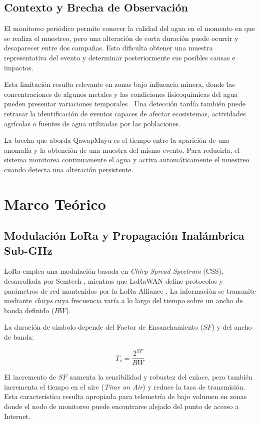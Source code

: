 \documentclass[11pt,a4paper]{article}
\begin{document}
\subsection{Contexto y Brecha de Observación}

El monitoreo periódico permite conocer la calidad del agua en el momento en que se realiza el muestreo, pero una alteración de corta duración puede ocurrir y desaparecer entre dos campañas. Esto dificulta obtener una muestra representativa del evento y determinar posteriormente sus posibles causas e impactos.

Esta limitación resulta relevante en zonas bajo influencia minera, donde las concentraciones de algunos metales y las condiciones fisicoquímicas del agua pueden presentar variaciones temporales \cite{moreno2024,ocona2024}. Una detección tardía también puede retrasar la identificación de eventos capaces de afectar ecosistemas, actividades agrícolas o fuentes de agua utilizadas por las poblaciones.

La brecha que aborda QawapMayu es el tiempo entre la aparición de una anomalía y la obtención de una muestra del mismo evento. Para reducirla, el sistema monitorea continuamente el agua y activa automáticamente el muestreo cuando detecta una alteración persistente.

\section{Marco Teórico}

\subsection{Modulación LoRa y Propagación Inalámbrica Sub-GHz}

LoRa emplea una modulación basada en \textit{Chirp Spread Spectrum} (CSS), desarrollada por Semtech \cite{semtech}, mientras que LoRaWAN define protocolos y parámetros de red mantenidos por la LoRa Alliance \cite{lora}. La información se transmite mediante \textit{chirps} cuya frecuencia varía a lo largo del tiempo sobre un ancho de banda definido ($BW$).

La duración de símbolo depende del Factor de Ensanchamiento ($SF$) y del ancho de banda:

\begin{equation}
    T_s = \frac{2^{SF}}{BW}
\end{equation}

El incremento de $SF$ aumenta la sensibilidad y robustez del enlace, pero también incrementa el tiempo en el aire (\textit{Time on Air}) y reduce la tasa de transmisión. Esta característica resulta apropiada para telemetría de bajo volumen en zonas donde el nodo de monitoreo puede encontrarse alejado del punto de acceso a Internet.
\end{document}
